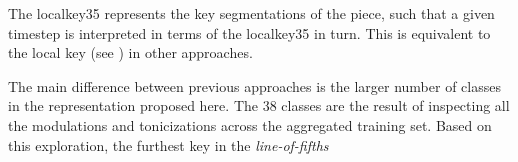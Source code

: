 
The \gls{localkey35} represents the key segmentations of the
piece, such that a given timestep is interpreted in terms of
the \gls{localkey35} in turn. This is equivalent to the
local key (see ) in other approaches.

The main difference between previous approaches is the
larger number of classes in the representation proposed
here. The 38 classes are the result of inspecting all the
modulations and tonicizations across the aggregated training
set. Based on this exploration, the furthest key in the \emph{line-of-fifths} \parencite{}
